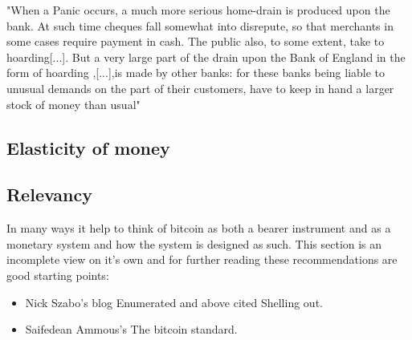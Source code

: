 \begin{displayquote}
	"When a Panic occurs, a much more serious home-drain is produced upon the bank. At such time cheques fall somewhat into disrepute, so that merchants in some cases require payment in cash. The public also, to some extent, take to hoarding[...]. But a very large part of the drain upon the Bank of England in the form of hoarding ,[...],is made by other banks: for these banks being liable to unusual demands on the part of their customers, have to keep in hand a larger stock of money than usual"\cite{patterson:monetary:drains}
\end{displayquote}

\subsection{Elasticity of money}





\hskip 5pt









\subsection{Relevancy}
In many ways it help to think of bitcoin
as both a bearer instrument and as a monetary system and how the 
system is designed as such. This
section is an incomplete view on it's own and for
further reading these recommendations are good starting points: 

\begin{itemize}
	\item Nick Szabo's blog Enumerated and above cited Shelling out\cite{szabo:shelling:out}.
	\item Saifedean Ammous's The bitcoin standard.
\end{itemize}



